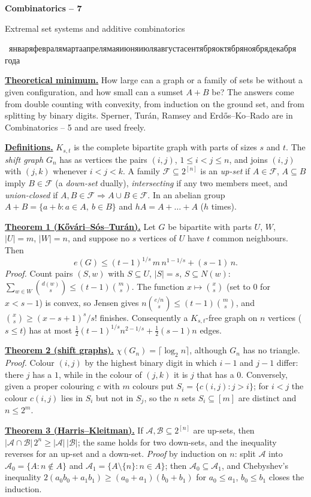 \documentclass[11pt,a4paper]{article}
\newcommand{\head}[1]{\par\medskip\noindent\textbf{\underline{#1}}\quad}
\newcommand{\sheettitle}[3]{%
  \begin{center}
  {\huge\bfseries #1\par}\vspace{1.2em}
  {\Large #2\par}\vspace{0.8em}
  \if\relax\detokenize{#3}\relax\else{\Large #3\par}\vspace{0.8em}\fi
  {\rudate\par}
  \end{center}\vspace{0.5em}}
\newcommand{\rudate}{\foreignlanguage{russian}{\number\day~\ifcase\month\or января\or февраля\or марта\or апреля\or мая\or июня\or июля\or августа\or сентября\or октября\or ноября\or декабря\fi\ \number\year~года}}
\begin{document}
\sheettitle{Combinatorics -- 7}{Extremal set systems and additive combinatorics}{}

\head{Theoretical minimum.} How large can a graph or a family of sets be without a given
configuration, and how small can a sumset $A+B$ be? The answers come from double counting
with convexity, from induction on the ground set, and from splitting by binary digits.
Sperner, Tur\'an, Ramsey and Erd\H{o}s--Ko--Rado are in Combinatorics -- 5 and are used freely.

\head{Definitions.} $K_{s,t}$ is the complete bipartite graph with parts of sizes $s$ and $t$.
The \emph{shift graph} $G_n$ has as vertices the pairs $(i,j)$, $1\leqslant i<j\leqslant n$,
and joins $(i,j)$ with $(j,k)$ whenever $i<j<k$. A family $\mathcal F\subseteq2^{[n]}$ is an
\emph{up-set} if $A\in\mathcal F$, $A\subseteq B$ imply $B\in\mathcal F$ (a \emph{down-set}
dually), \emph{intersecting} if any two members meet, and \emph{union-closed} if
$A,B\in\mathcal F\Rightarrow A\cup B\in\mathcal F$. In an abelian group
$A+B=\{a+b:a\in A,\ b\in B\}$ and $hA=A+\dots+A$ ($h$ times).

\head{Theorem 1 (K\H{o}v\'ari--S\'os--Tur\'an).} Let $G$ be bipartite with parts $U$, $W$,
$|U|=m$, $|W|=n$, and suppose no $s$ vertices of $U$ have $t$ common neighbours. Then
\[
e(G)\leqslant (t-1)^{1/s}\,m\,n^{1-1/s}+(s-1)\,n .
\]
\emph{Proof.} Count pairs $(S,w)$ with $S\subseteq U$, $|S|=s$, $S\subseteq N(w)$:
$\sum_{w\in W}\binom{d(w)}{s}\leqslant(t-1)\binom ms$. The function $x\mapsto\binom xs$
(set to $0$ for $x<s-1$) is convex, so Jensen gives $n\binom{e/n}{s}\leqslant(t-1)\binom ms$,
and $\binom xs\geqslant(x-s+1)^s/s!$ finishes. Consequently a $K_{s,t}$-free graph on $n$
vertices ($s\leqslant t$) has at most $\frac12(t-1)^{1/s}n^{2-1/s}+\frac12(s-1)n$ edges.

\head{Theorem 2 (shift graphs).} $\chi(G_n)=\lceil\log_2 n\rceil$, although $G_n$ has no
triangle. \emph{Proof.} Colour $(i,j)$ by the highest binary digit in which $i-1$ and $j-1$
differ: there $j$ has a $1$, while in the colour of $(j,k)$ it is $j$ that has a $0$.
Conversely, given a proper colouring $c$ with $m$ colours put
$S_i=\{c(i,j):j>i\}$; for $i<j$ the colour $c(i,j)$ lies in $S_i$ but not in $S_j$, so the
$n$ sets $S_i\subseteq[m]$ are distinct and $n\leqslant 2^m$.

\head{Theorem 3 (Harris--Kleitman).} If $\mathcal A,\mathcal B\subseteq2^{[n]}$ are up-sets,
then $|\mathcal A\cap\mathcal B|\,2^n\geqslant|\mathcal A|\,|\mathcal B|$; the same holds for two
down-sets, and the inequality reverses for an up-set and a down-set. \emph{Proof} by induction
on $n$: split $\mathcal A$ into $\mathcal A_0=\{A:n\notin A\}$ and
$\mathcal A_1=\{A\setminus\{n\}:n\in A\}$; then $\mathcal A_0\subseteq\mathcal A_1$, and
Chebyshev's inequality $2(a_0b_0+a_1b_1)\geqslant(a_0+a_1)(b_0+b_1)$ for $a_0\leqslant a_1$,
$b_0\leqslant b_1$ closes the induction.
\end{document}
